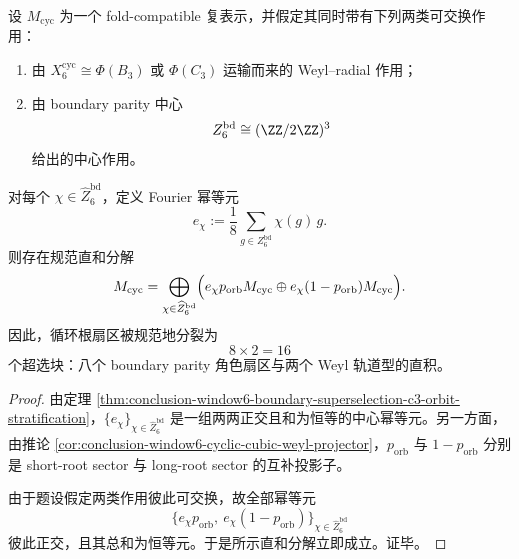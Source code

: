 \begin{theorem}\label{thm:conclusion-window6-cyclic-orbit-parity-sixteenfold}
设 \(M_{\mathrm{cyc}}\) 为一个 fold-compatible 复表示，并假定其同时带有下列两类可交换作用：
\begin{enumerate}
  \item 由 \(X_6^{\mathrm{cyc}}\cong \Phi(B_3)\) 或 \(\Phi(C_3)\) 运输而来的 Weyl--radial 作用；
  \item 由 boundary parity 中心
  \[
  Z_6^{\mathrm{bd}}\cong (\ZZ/2\ZZ)^3
  \]
  给出的中心作用。
\end{enumerate}
对每个 \(\chi\in \widehat Z_6^{\mathrm{bd}}\)，定义 Fourier 幂等元
\[
e_\chi:=\frac18\sum_{g\in Z_6^{\mathrm{bd}}}\chi(g)\,g.
\]
则存在规范直和分解
\[
M_{\mathrm{cyc}}
=
\bigoplus_{\chi\in \widehat Z_6^{\mathrm{bd}}}
\Bigl(
e_\chi p_{\mathrm{orb}}M_{\mathrm{cyc}}
\oplus
e_\chi(1-p_{\mathrm{orb}})M_{\mathrm{cyc}}
\Bigr).
\]
因此，循环根扇区被规范地分裂为
\[
8\times 2=16
\]
个超选块：八个 boundary parity 角色扇区与两个 Weyl 轨道型的直积。
\end{theorem}
\begin{proof}
由定理 \ref{thm:conclusion-window6-boundary-superselection-c3-orbit-stratification}，\(\{e_\chi\}_{\chi\in \widehat Z_6^{\mathrm{bd}}}\) 是一组两两正交且和为恒等的中心幂等元。另一方面，由推论 \ref{cor:conclusion-window6-cyclic-cubic-weyl-projector}，\(p_{\mathrm{orb}}\) 与 \(1-p_{\mathrm{orb}}\) 分别是 short-root sector 与 long-root sector 的互补投影子。

由于题设假定两类作用彼此可交换，故全部幂等元
\[
\{e_\chi p_{\mathrm{orb}},\ e_\chi(1-p_{\mathrm{orb}})\}_{\chi\in\widehat Z_6^{\mathrm{bd}}}
\]
彼此正交，且其总和为恒等元。于是所示直和分解立即成立。证毕。
\end{proof}
